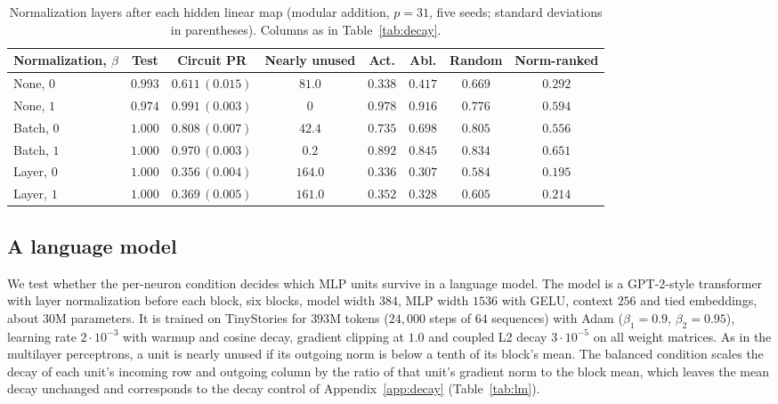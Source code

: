 \documentclass{article} %
\begin{document}
\begin{table}[!ht]
\caption{Normalization layers after each hidden linear map (modular addition, $p=31$, five seeds; standard deviations in parentheses). Columns as in Table~\ref{tab:decay}.}
\label{tab:normlayers}
\begin{center}
\footnotesize
\setlength{\tabcolsep}{4pt}
\begin{tabular}{lccccccc}
\toprule
Normalization, $\beta$ & Test & Circuit PR & Nearly unused & Act. & Abl. & Random & Norm-ranked \\
\midrule
None, $0$ & $0.993$ & $0.611\,(0.015)$ & $81.0$ & $0.338$ & $0.417$ & $0.669$ & $0.292$ \\
None, $1$ & $0.974$ & $0.991\,(0.003)$ & $0$ & $0.978$ & $0.916$ & $0.776$ & $0.594$ \\
Batch, $0$ & $1.000$ & $0.808\,(0.007)$ & $42.4$ & $0.735$ & $0.698$ & $0.805$ & $0.556$ \\
Batch, $1$ & $1.000$ & $0.970\,(0.003)$ & $0.2$ & $0.892$ & $0.845$ & $0.834$ & $0.651$ \\
Layer, $0$ & $1.000$ & $0.356\,(0.004)$ & $164.0$ & $0.336$ & $0.307$ & $0.584$ & $0.195$ \\
Layer, $1$ & $1.000$ & $0.369\,(0.005)$ & $161.0$ & $0.352$ & $0.328$ & $0.605$ & $0.214$ \\
\bottomrule
\end{tabular}
\end{center}
\end{table}

\subsection{A language model}
\label{app:lm}
We test whether the per-neuron condition decides which MLP units survive in a language model. The model is a GPT-2-style transformer with layer normalization before each block, six blocks, model width $384$, MLP width $1536$ with GELU, context $256$ and tied embeddings, about $30$M parameters. It is trained on TinyStories \citep{eldan2023tinystories} for $393$M tokens ($24{,}000$ steps of $64$ sequences) with Adam ($\beta_1 = 0.9$, $\beta_2 = 0.95$), learning rate $2 \cdot 10^{-3}$ with warmup and cosine decay, gradient clipping at $1.0$ and coupled L2 decay $3 \cdot 10^{-5}$ on all weight matrices. As in the multilayer perceptrons, a unit is nearly unused if its outgoing norm is below a tenth of its block's mean. The balanced condition scales the decay of each unit's incoming row and outgoing column by the ratio of that unit's gradient norm to the block mean, which leaves the mean decay unchanged and corresponds to the decay control of Appendix~\ref{app:decay} (Table~\ref{tab:lm}).
\end{document}
